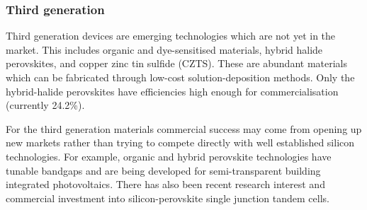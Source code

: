 \subsubsection{Third generation}

Third generation devices are emerging technologies which are not yet in the market. This includes organic and dye-sensitised materials, hybrid halide perovskites, and copper zinc tin sulfide (CZTS). These are abundant materials which can be fabricated through low-cost solution-deposition methods. Only the hybrid-halide perovskites have efficiencies high enough for commercialisation (currently 24.2\%).

For the third generation materials commercial success may come from opening up new markets rather than trying to compete directly with well established silicon technologies. For example, organic and hybrid perovskite technologies have tunable bandgaps and are being developed for semi-transparent building integrated photovoltaics.
There has also been recent research interest and commercial investment into silicon-perovskite single junction tandem cells.








